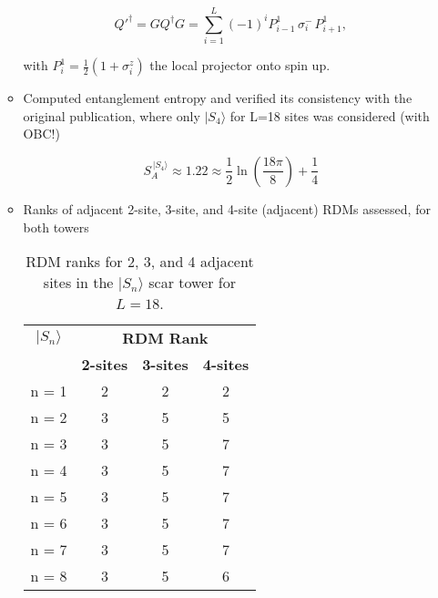 \documentclass[11pt]{article}
\begin{document}
\begin{itemize}
\begin{itemize}
	\begin{equation}
	Q'^\dagger = G Q^\dagger G = \sum_{i = 1}^{L} (-1)^i P^1_{i-1} \, \sigma^-_i \, P^1_{i+1},
	\end{equation}
	
	\noindent with $P^1_i = \frac{1}{2}(1 + \sigma^z_i)$ the local projector onto spin up.
        \item Computed entanglement entropy and verified its consistency with the original publication, where only $|S_4\rangle$ for L=18 sites was considered (with OBC!)
        
         \begin{equation}
        S^{\,|S_4\rangle}_A \approx 1.22 \approx \frac{1}{2} \ln \left(\frac{18 \pi}{8}\right) + \frac{1}{4}
        \end{equation}
        
        \item Ranks of adjacent 2-site, 3-site, and 4-site (adjacent) RDMs assessed, for both towers
        
        \begin{table}[h]
	\centering
	\begin{tabular}{|c|ccc|}
	\hline
	\textbf{$|S_n\rangle$} & \multicolumn{3}{c|}{\textbf{RDM Rank}} \\
	\cline{2-4}
	& \textbf{2-sites} & \textbf{3-sites} & \textbf{4-sites} \\
	\hline
	 n = 1 & 2 & 2 & 2 \\
	 n = 2 & 3 & 5 & 5 \\
	 n = 3 & 3 & 5 & 7 \\
	 n = 4 & 3 & 5 & 7 \\  
	 n = 5 & 3 & 5 & 7 \\
	 n = 6 & 3 & 5 & 7 \\
	 n = 7 & 3 & 5 & 7 \\
	 n = 8 & 3 & 5 & 6 \\
	\hline
	\end{tabular}
	\caption{RDM ranks for 2, 3, and 4 adjacent sites in the $|S_n\rangle$ scar tower for $L=18$.}
	\label{tab:ranks1}
	\end{table}


\end{itemize}
\end{itemize}
\end{document}
